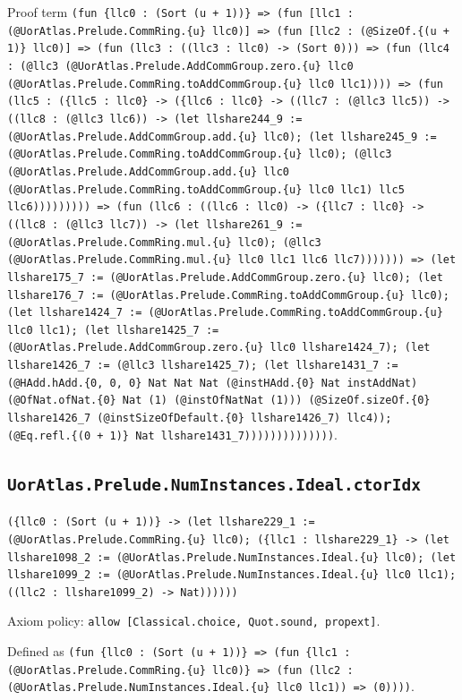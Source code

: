 \documentclass[11pt]{article}
\begin{document}
\noindent Proof term \texttt{(fun \{llc0 : (Sort (u + 1))\} => (fun [llc1 : (@UorAtlas.Prelude.CommRing.\{u\} llc0)] => (fun [llc2 : (@SizeOf.\{(u + 1)\} llc0)] => (fun (llc3 : ((llc3 : llc0) -> (Sort 0))) => (fun (llc4 : (@llc3 (@UorAtlas.Prelude.AddCommGroup.zero.\{u\} llc0 (@UorAtlas.Prelude.CommRing.toAddCommGroup.\{u\} llc0 llc1)))) => (fun (llc5 : (\{llc5 : llc0\} -> (\{llc6 : llc0\} -> ((llc7 : (@llc3 llc5)) -> ((llc8 : (@llc3 llc6)) -> (let llshare244\_9 := (@UorAtlas.Prelude.AddCommGroup.add.\{u\} llc0); (let llshare245\_9 := (@UorAtlas.Prelude.CommRing.toAddCommGroup.\{u\} llc0); (@llc3 (@UorAtlas.Prelude.AddCommGroup.add.\{u\} llc0 (@UorAtlas.Prelude.CommRing.toAddCommGroup.\{u\} llc0 llc1) llc5 llc6))))))))) => (fun (llc6 : ((llc6 : llc0) -> (\{llc7 : llc0\} -> ((llc8 : (@llc3 llc7)) -> (let llshare261\_9 := (@UorAtlas.Prelude.CommRing.mul.\{u\} llc0); (@llc3 (@UorAtlas.Prelude.CommRing.mul.\{u\} llc0 llc1 llc6 llc7))))))) => (let llshare175\_7 := (@UorAtlas.Prelude.AddCommGroup.zero.\{u\} llc0); (let llshare176\_7 := (@UorAtlas.Prelude.CommRing.toAddCommGroup.\{u\} llc0); (let llshare1424\_7 := (@UorAtlas.Prelude.CommRing.toAddCommGroup.\{u\} llc0 llc1); (let llshare1425\_7 := (@UorAtlas.Prelude.AddCommGroup.zero.\{u\} llc0 llshare1424\_7); (let llshare1426\_7 := (@llc3 llshare1425\_7); (let llshare1431\_7 := (@HAdd.hAdd.\{0, 0, 0\} Nat Nat Nat (@instHAdd.\{0\} Nat instAddNat) (@OfNat.ofNat.\{0\} Nat (1) (@instOfNatNat (1))) (@SizeOf.sizeOf.\{0\} llshare1426\_7 (@instSizeOfDefault.\{0\} llshare1426\_7) llc4)); (@Eq.refl.\{(0 + 1)\} Nat llshare1431\_7))))))))))))))}.\par
\subsection*{\texttt{UorAtlas.Prelude.NumInstances.Ideal.ctorIdx}}
\noindent\texttt{(\{llc0 : (Sort (u + 1))\} -> (let llshare229\_1 := (@UorAtlas.Prelude.CommRing.\{u\} llc0); (\{llc1 : llshare229\_1\} -> (let llshare1098\_2 := (@UorAtlas.Prelude.NumInstances.Ideal.\{u\} llc0); (let llshare1099\_2 := (@UorAtlas.Prelude.NumInstances.Ideal.\{u\} llc0 llc1); ((llc2 : llshare1099\_2) -> Nat))))))}\par
\noindent Axiom policy: \texttt{allow [Classical.choice, Quot.sound, propext]}.\par
\noindent Defined as \texttt{(fun \{llc0 : (Sort (u + 1))\} => (fun \{llc1 : (@UorAtlas.Prelude.CommRing.\{u\} llc0)\} => (fun (llc2 : (@UorAtlas.Prelude.NumInstances.Ideal.\{u\} llc0 llc1)) => (0))))}.\par
\end{document}
